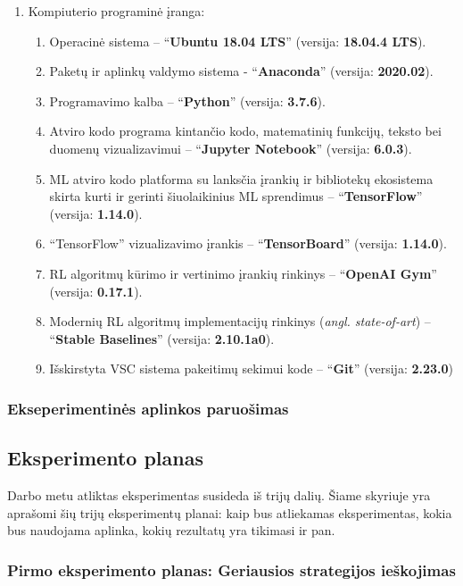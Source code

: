 \documentclass{VUMIFPSbakalaurinis}
\begin{document}
{\begin{enumerate}
	\item Kompiuterio programinė įranga:
	\begin{enumerate}
		\item Operacinė sistema -- \enquote{\textbf{Ubuntu 18.04 LTS}} (versija: \textbf{18.04.4 LTS}).
		\item Paketų ir aplinkų valdymo sistema - \enquote{\textbf{Anaconda}}  (versija: \textbf{2020.02}).
		\item Programavimo kalba -- \enquote{\textbf{Python}} (versija: \textbf{3.7.6}).
		\item Atviro kodo programa kintančio kodo, matematinių funkcijų, teksto bei duomenų vizualizavimui -- \enquote{\textbf{Jupyter Notebook}}  (versija: \textbf{6.0.3}).
		\item ML atviro kodo platforma su lanksčia įrankių ir bibliotekų ekosistema skirta kurti ir gerinti šiuolaikinius ML sprendimus -- \enquote{\textbf{TensorFlow}} (versija: \textbf{1.14.0}).
		\item \enquote{TensorFlow} vizualizavimo įrankis -- \enquote{\textbf{TensorBoard}} (versija: \textbf{1.14.0}).
		\item RL algoritmų kūrimo ir vertinimo įrankių rinkinys -- \enquote{\textbf{OpenAI Gym}} (versija: \textbf{0.17.1}).
		\item Modernių RL algoritmų implementacijų rinkinys (\textit{angl. state-of-art}) -- \enquote{\textbf{Stable Baselines}} (versija: \textbf{2.10.1a0}).
		\item Išskirstyta VSC sistema pakeitimų sekimui kode -- \enquote{\textbf{Git}} (versija: \textbf{2.23.0}) 
	\end{enumerate}
\end{enumerate}
}
\subsubsection{Ekseperimentinės aplinkos paruošimas}

\subsection{Eksperimento planas}
{
	Darbo metu atliktas eksperimentas susideda iš trijų dalių. Šiame skyriuje yra aprašomi šių trijų eksperimentų planai: kaip bus atliekamas eksperimentas, kokia bus naudojama aplinka, kokių rezultatų yra tikimasi ir pan.
}
\subsubsection{Pirmo eksperimento planas: Geriausios strategijos ieškojimas}
\end{document}
